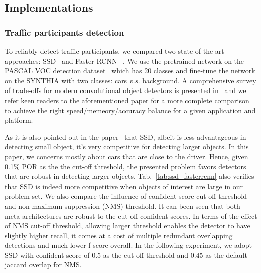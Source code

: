 \documentclass[10pt,twocolumn,letterpaper]{article}
\begin{document}
\subsection{Implementations}\label{sec:Implementations}


\subsubsection{Traffic participants detection}

To reliably detect traffic participants, we compared two state-of-the-art approaches: SSD~\cite{liu2016ssd} and Faster-RCNN ~\cite{ren2015faster_nips}.
We use the pretrained network on the PASCAL VOC detection dataset~\cite{everingham2015pascal} which has 20 classes and fine-tune the network on the SYNTHIA with two classes: cars \emph{v.s.} background.
A comprehensive survey of trade-offs for modern convolutional object detectors is presented in~\cite{huang2017speed} and we refer keen readers to the aforementioned paper for a more complete comparison to achieve the right speed/memeory/accuracy balance for a given application and platform.

As it is also pointed out in the paper~\cite{huang2017speed} that SSD, albeit is less advantageous in detecting small object, it's very competitive for detecting larger objects. In this paper, we concerns mostly about cars that are close to the driver. Hence, given 0.1\% POR as the the cut-off threshold, the presented problem favors detectors that are robust in detecting larger objects.
Tab.~\ref{tab:ssd_fasterrcnn} also verifies that SSD is indeed more competitive when objects of interest are large in our problem set. We also compare the influence of confident score cut-off threshold and non-maximum suppression (NMS) threshold. It can been seen that both meta-architectures are robust to the cut-off confident scores.
In terms of the effect of NMS cut-off threshold, allowing larger threshold enables the detector to have slightly higher recall, it comes at a cost of multiple redundant overlapping detections and much lower f-score overall. In the following experiment, we adopt SSD with confident score of 0.5 as the cut-off threshold and 0.45 as the default jaccard overlap for NMS.
\end{document}
